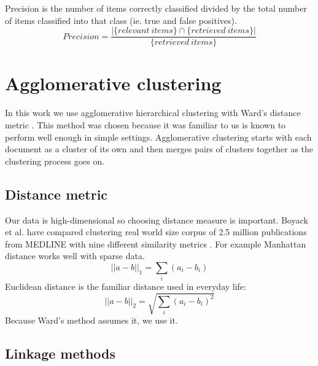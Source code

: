 Precision is the number of items correctly classified divided by 
the total number of items classified into that class (ie. true and 
false positives).
\begin{equation}
 Precision = \frac{|\{relevant\ items\} \cap \{retrieved\ 
items\}|} 
{\{retrieved\ items\}}
\end{equation}


\section{Agglomerative clustering}
\label{sec:agglomerativeclustering}
In this work we use agglomerative hierarchical clustering with 
Ward's distance metric \cite{ward_jr_hierarchical_1963}. This 
method was chosen because it was familiar to us is known to 
perform well enough in simple settings. 
Agglomerative clustering starts with each document 
as a cluster of its own and then merges pairs of clusters together 
as the clustering process goes on.


\subsection{Distance metric}
Our data is high-dimensional so choosing distance measure is 
important. 
Boyack et al. have compared clustering real world size corpus of 
2.5 million publications from MEDLINE with nine different 
similarity metrics \cite{boyack_clustering_2011}.
For example Manhattan distance works well with sparse data.
\begin{equation}
 ||a-b||_1 = \sum_i{(a_i-b_i)}
\end{equation}
Euclidean distance is the familiar distance used in everyday life:
\begin{equation}
 ||a-b||_2 = \sqrt{\sum_i{(a_i-b_i)^2}}
\end{equation}
Because Ward's method assumes it, we use it.



\subsection{Linkage methods}

